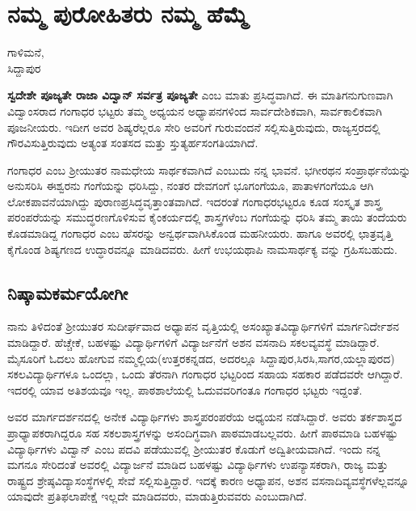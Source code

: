 {\fontsize{14}{16}\selectfont
\chapter{ನಮ್ಮ ಪುರೋಹಿತರು   \enginline{-}   ನಮ್ಮ ಹೆಮ್ಮೆ}

\begin{center}
\smallskip

ಗಾಳಿಮನೆ,\\ 
ಸಿದ್ದಾಪುರ	
\addrule
\end{center}

\textbf{ಸ್ವದೇಶೇ ಪೂಜ್ಯತೇ ರಾಜಾ ವಿದ್ವಾನ್ ಸರ್ವತ್ರ ಪೂಜ್ಯತೇ} ಎಂಬ ಮಾತು ಪ್ರಸಿದ್ಧವಾಗಿದೆ. ಈ ಮಾತಿಗನುಗುಣವಾಗಿ ವಿದ್ವಾಂಸರಾದ ಗಂಗಾಧರ ಭಟ್ಟರು ತಮ್ಮ ಅಧ್ಯಯನ  \enginline{-}  ಅಧ್ಯಾಪನಗಳಿಂದ ಸಾರ್ವದೇಶಿಕವಾಗಿ, ಸಾರ್ವಕಾಲಿಕವಾಗಿ ಪೂಜನೀಯರು. ಇದೀಗ ಅವರ ಶಿಷ್ಯರೆಲ್ಲರೂ ಸೇರಿ ಅವರಿಗೆ ಗುರುವಂದನೆ ಸಲ್ಲಿಸುತ್ತಿರುವುದು, ರಾಜ್ಯಸ್ತರದಲ್ಲಿ ಗೌರವಿಸುತ್ತಿರುವುದು ಅತ್ಯಂತ ಸಂತಸದ ಮತ್ತು ಸ್ತುತ್ಯರ್ಹಸಂಗತಿಯಾಗಿದೆ. 

ಗಂಗಾಧರ ಎಂಬ ಶ್ರೀಯುತರ ನಾಮಧೇಯ ಸಾರ್ಥಕವಾಗಿದೆ ಎಂಬುದು ನನ್ನ ಭಾವನೆ. ಭಗೀರಥನ ಸಂಪ್ರಾರ್ಥನೆಯನ್ನು ಅನುಸರಿಸಿ ಈಶ್ವರನು ಗಂಗೆಯನ್ನು ಧರಿಸಿದ್ದು, ನಂತರ  ದೇವಗಂಗೆ ಭೂಗಂಗೆಯೂ, ಪಾತಾಳಗಂಗೆಯೂ ಆಗಿ ಲೋಕಪಾವನೆಯಾಗಿದ್ದು ಪುರಾಣಪ್ರಸಿದ್ಧವೃತ್ತಾಂತವಾಗಿದೆ. ಇದರಂತೆ ಗಂಗಾಧರಭಟ್ಟರೂ ಕೂಡ ಸಂಸ್ಕೃತ  \enginline{-}  ಶಾಸ್ತ್ರ ಪರಂಪರೆಯನ್ನು ಸಮುದ್ಧರಣಗೊಳಿಸುವ ಕೈಂಕರ್ಯದಲ್ಲಿ ಶಾಸ್ತ್ರಗಳೆಂಬ ಗಂಗೆಯನ್ನು ಧರಿಸಿ ತಮ್ಮ ತಾಯಿ  \enginline{-}  ತಂದೆಯರು ಕೊಡಮಾಡಿದ್ದ ಗಂಗಾಧರ ಎಂಬ ಹೆಸರನ್ನು ಅನ್ವರ್ಥವಾಗಿಸಿಕೊಂಡ ಮಹನೀಯರು. ಹಾಗೂ ಅವರಲ್ಲಿ ಛಾತ್ರವೃತ್ತಿ ಕೈಗೊಂಡ ಶಿಷ್ಯಗಣದ ಉದ್ಧಾರವನ್ನೂ ಮಾಡಿದವರು. ಹೀಗೆ ಉಭಯಥಾಪಿ ನಾಮಸಾರ್ಥಕ್ಯ ವನ್ನು ಗ್ರಹಿಸಬಹುದು. 

\section*{ನಿಷ್ಕಾಮಕರ್ಮಯೋಗೀ} 

ನಾನು ತಿಳಿದಂತೆ ಶ್ರೀಯುತರ ಸುದೀರ್ಘವಾದ ಅಧ್ಯಾಪನ ವೃತ್ತಿಯಲ್ಲಿ ಅಸಂಖ್ಯಾತವಿದ್ಯಾರ್ಥಿಗಳಿಗೆ ಮಾರ್ಗನಿರ್ದೇಶನ ಮಾಡಿದ್ದಾರೆ. ಹೆಚ್ಚೇಕೆ, ಬಹಳಷ್ಟು ವಿದ್ಯಾರ್ಥಿಗಳಿಗೆ ವಿದ್ಯಾರ್ಜನೆಗೆ ಅಶನ  \enginline{-}  ವಸನಾದಿ ಸಕಲವ್ಯವಸ್ಥೆ ಮಾಡಿದ್ದಾರೆ. ಮೈಸೂರಿಗೆ ಓದಲು ಹೋಗುವ ನಮ್ಮಲ್ಲಿಯ(ಉತ್ತರಕನ್ನಡದ, ಅದರಲ್ಲೂ ಸಿದ್ದಾಪುರ,ಸಿರಸಿ,ಸಾಗರ,ಯಲ್ಲಾಪುರದ) ಸಕಲವಿದ್ಯಾರ್ಥಿಗಳೂ ಒಂದಲ್ಲಾ, ಒಂದು ತೆರನಾಗಿ ಗಂಗಾಧರ ಭಟ್ಟರಿಂದ ಸಹಾಯ  \enginline{-}  ಸಹಕಾರ ಪಡೆದವರೇ ಆಗಿದ್ದಾರೆ. ಇದರಲ್ಲಿ ಯಾವ ಅತಿಶಯವೂ ಇಲ್ಲ. ಪಾಠಶಾಲೆಯಲ್ಲಿ ಓದುವವರಿಗಂತೂ ಗಂಗಾಧರ ಭಟ್ಟರು  ಇದ್ದಂತೆ.  

ಅವರ ಮಾರ್ಗದರ್ಶನದಲ್ಲಿ ಅನೇಕ ವಿದ್ಯಾರ್ಥಿಗಳು ಶಾಸ್ತ್ರಪರಂಪರೆಯ ಅಧ್ಯಯನ ನಡೆಸಿದ್ದಾರೆ. ಅವರು ತರ್ಕಶಾಸ್ತ್ರದ ಪ್ರಾಧ್ಯಾಪಕರಾಗಿದ್ದರೂ ಸಹ ಸಕಲಶಾಸ್ತ್ರಗಳನ್ನು ಅಸಂದಿಗ್ಧವಾಗಿ  ಪಾಠಮಾಡಬಲ್ಲವರು. ಹೀಗೆ ಪಾಠಮಾಡಿ ಬಹಳಷ್ಟು ವಿದ್ಯಾರ್ಥಿಗಳು ವಿದ್ವಾನ್ ಎಂಬ ಪದವಿ ಪಡೆಯುವಲ್ಲಿ ಶ್ರೀಯುತರ ಕೊಡುಗೆ ಅದ್ವಿತೀಯವಾಗಿದೆ. ಇಂದು ನನ್ನ ಮಗನೂ ಸೇರಿದಂತೆ ಅವರಲ್ಲಿ ವಿದ್ಯಾರ್ಜನೆ ಮಾಡಿದ ಬಹಳಷ್ಟು ವಿದ್ಯಾರ್ಥಿಗಳು ಉಪನ್ಯಾಸಕರಾಗಿ,  ರಾಜ್ಯ ಮತ್ತು ರಾಷ್ಟ್ರದ ಶ್ರೇಷ್ಠವಿದ್ಯಾಸಂಸ್ಥೆಗಳಲ್ಲಿ ಸೇವೆ ಸಲ್ಲಿಸುತ್ತಿದ್ದಾರೆ. ಇದಕ್ಕೆ ಕಾರಣ ಅಧ್ಯಾಪನ, ಅಶನ  \enginline{-}  ವಸನಾದಿವ್ಯವಸ್ಥೆಗಳೆಲ್ಲವನ್ನೂ ಯಾವುದೇ ಪ್ರತಿಫಲಾಪೇಕ್ಷೆ ಇಲ್ಲದೇ ಮಾಡಿದವರು, ಮಾಡುತ್ತಿರುವವರು ಎಂಬುದಾಗಿದೆ. 

}
